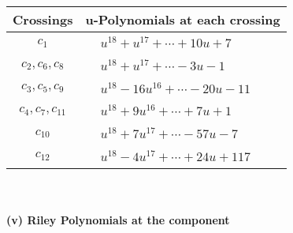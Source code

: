 \documentclass[1p]{elsarticle_modified}
\theoremstyle{definition}
\begin{document}
\begin{tabular}{m{50pt}|m{274pt}}
Crossings & \hspace{64pt}u-Polynomials at each crossing \\
\hline $$\begin{aligned}c_{1}\end{aligned}$$&$\begin{aligned}
&u^{18}+u^{17}+\cdots+10 u+7
\end{aligned}$\\
\hline $$\begin{aligned}c_{2},c_{6},c_{8}\end{aligned}$$&$\begin{aligned}
&u^{18}+u^{17}+\cdots-3 u-1
\end{aligned}$\\
\hline $$\begin{aligned}c_{3},c_{5},c_{9}\end{aligned}$$&$\begin{aligned}
&u^{18}-16 u^{16}+\cdots-20 u-11
\end{aligned}$\\
\hline $$\begin{aligned}c_{4},c_{7},c_{11}\end{aligned}$$&$\begin{aligned}
&u^{18}+9 u^{16}+\cdots+7 u+1
\end{aligned}$\\
\hline $$\begin{aligned}c_{10}\end{aligned}$$&$\begin{aligned}
&u^{18}+7 u^{17}+\cdots-57 u-7
\end{aligned}$\\
\hline $$\begin{aligned}c_{12}\end{aligned}$$&$\begin{aligned}
&u^{18}-4 u^{17}+\cdots+24 u+117
\end{aligned}$\\
\hline
\end{tabular}\\~\\
\newpage\renewcommand{\arraystretch}{1}
\flushleft \textbf{(v) Riley Polynomials at the component}\newline \\
\end{document}
